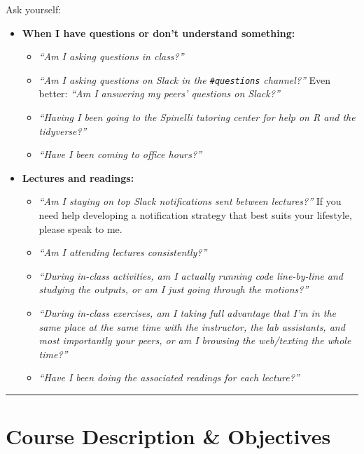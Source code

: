 \documentclass[
  letterpaper,
  DIV=11,
  numbers=noendperiod]{scrartcl}
\providecommand{\tightlist}{%
  \setlength{\itemsep}{0pt}\setlength{\parskip}{0pt}}\usepackage{longtable,booktabs,array}
\begin{document}
Ask yourself:

\begin{itemize}
\tightlist
\item
  \textbf{When I have questions or don't understand something:}

  \begin{itemize}
  \tightlist
  \item
    \emph{``Am I asking questions in class?''}
  \item
    \emph{``Am I asking questions on Slack in the \texttt{\#questions}
    channel?''} Even better: \emph{``Am I answering my peers' questions
    on Slack?''}
  \item
    \emph{``Having I been going to the Spinelli tutoring center for help
    on R and the tidyverse?''}
  \item
    \emph{``Have I been coming to office hours?''}
  \end{itemize}
\item
  \textbf{Lectures and readings:}

  \begin{itemize}
  \tightlist
  \item
    \emph{``Am I staying on top Slack notifications sent between
    lectures?''} If you need help developing a notification strategy
    that best suits your lifestyle, please speak to me.
  \item
    \emph{``Am I attending lectures consistently?''}
  \item
    \emph{``During in-class activities, am I actually running code
    line-by-line and studying the outputs, or am I just going through
    the motions?''}
  \item
    \emph{``During in-class exercises, am I taking full advantage that
    I'm in the same place at the same time with the instructor, the lab
    assistants, and most importantly your peers, or am I browsing the
    web/texting the whole time?''}
  \item
    \emph{``Have I been doing the associated readings for each
    lecture?''}
  \end{itemize}
\end{itemize}

\begin{center}\rule{0.5\linewidth}{0.5pt}\end{center}

\hypertarget{course-description-objectives}{%
\section{Course Description \&
Objectives}\label{course-description-objectives}}
\end{document}
